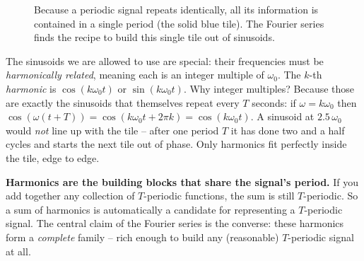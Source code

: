 \begin{figure}[H]
\centering
{}
\caption{Because a periodic signal repeats identically, all its information is contained in a single period (the solid blue tile). The Fourier series finds the recipe to build this single tile out of sinusoids.}
\label{ch06:fig-tile}
\end{figure}

The sinusoids we are allowed to use are special: their frequencies must be
\emph{harmonically related}, meaning each is an integer multiple of \(\omega_0\). The
\(k\)-th \emph{harmonic} is \(\cos(k\omega_0 t)\) or \(\sin(k\omega_0 t)\). Why integer
multiples? Because those are exactly the sinusoids that themselves repeat every \(T\)
seconds: if \(\omega = k\omega_0\) then \(\cos(\omega(t+T)) = \cos(k\omega_0 t + 2\pi k)
= \cos(k\omega_0 t)\). A sinusoid at \(2.5\,\omega_0\) would \emph{not} line up with the
tile -- after one period \(T\) it has done two and a half cycles and starts the next tile
out of phase. Only harmonics fit perfectly inside the tile, edge to edge.

\begin{whybox}
\textbf{Harmonics are the building blocks that share the signal's period.} If you add
together any collection of $T$-periodic functions, the sum is still $T$-periodic. So a sum
of harmonics is automatically a candidate for representing a $T$-periodic signal. The central
claim of the Fourier series is the converse: these harmonics form a \emph{complete} family
-- rich enough to build any (reasonable) $T$-periodic signal at all.
\end{whybox}

